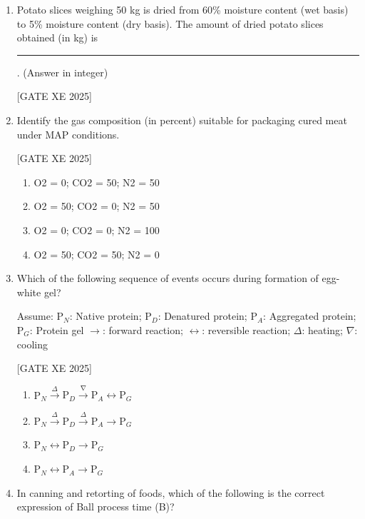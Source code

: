 \documentclass[journal,12pt,onecolumn]{IEEEtran}
\theoremstyle{remark}
\begin{document}
\begin{enumerate}
\hfill[GATE XE 2025]

\item Potato slices weighing 50 kg is dried from 60\% moisture content (wet basis) to 5\% moisture content (dry basis). The amount of dried potato slices obtained (in kg) is \rule{3cm}{0.15mm}. (Answer in integer)

\hfill[GATE XE 2025]

\item Identify the gas composition (in percent) suitable for packaging cured meat under MAP conditions.

\hfill[GATE XE 2025]

\begin{multicols}{2}
\begin{enumerate}
\item O2 = 0; CO2 = 50; N2 = 50
\item O2 = 50; CO2 = 0; N2 = 50
\item O2 = 0; CO2 = 0; N2 = 100
\item O2 = 50; CO2 = 50; N2 = 0
\end{enumerate}
\end{multicols}

\item Which of the following sequence of events occurs during formation of egg-white gel?

Assume: P$_{N}$: Native protein; P$_{D}$: Denatured protein; P$_{A}$: Aggregated protein; P$_{G}$: Protein gel
$\rightarrow$: forward reaction; $\leftrightarrow$: reversible reaction; $\Delta$: heating; $\nabla$: cooling

\hfill[GATE XE 2025]

\begin{multicols}{2}
\begin{enumerate}[label=(\Alph*)]
    \item P$_{N} \xrightarrow{\Delta} \text{P}_{D} \xrightarrow{\nabla} \text{P}_{A} \leftrightarrow \text{P}_{G}$
    \item P$_{N} \xrightarrow{\Delta} \text{P}_{D} \xrightarrow{\Delta} \text{P}_{A} \rightarrow \text{P}_{G}$
    \item P$_{N} \leftrightarrow \text{P}_{D} \rightarrow \text{P}_{G}$
    \item P$_{N} \leftrightarrow \text{P}_{A} \rightarrow \text{P}_{G}$
\end{enumerate}
\end{multicols}

\item In canning and retorting of foods, which of the following is the correct expression of Ball process time (B)?


\end{enumerate}
\end{document}
